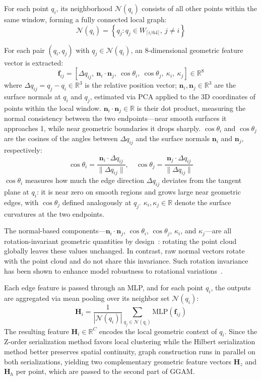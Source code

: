 \documentclass[a4paper,fleqn]{cas-sc}
\begin{document}
For each point $q_i$, its neighborhood $\mathcal{N}(q_i)$ consists of all other points within the same window, forming a fully connected local graph:
\begin{equation}
	\mathcal{N}(q_i) = \left\{q_j : q_j \in W_{\lceil i/64 \rceil},\ j \neq i\right\}
\end{equation}

For each pair $(q_i, q_j)$ with $q_j \in \mathcal{N}(q_i)$, an 8-dimensional geometric feature vector is extracted:
\begin{equation}
	\mathbf{f}_{ij} = [\Delta q_{ij},\ \mathbf{n}_i \cdot \mathbf{n}_j,\ \cos\theta_i,\ \cos\theta_j,\ \kappa_i,\ \kappa_j] \in \mathbb{R}^8
\end{equation}
where $\Delta q_{ij} = q_j - q_i \in \mathbb{R}^3$ is the relative position vector; $\mathbf{n}_i, \mathbf{n}_j \in \mathbb{R}^3$ are the surface normals at $q_i$ and $q_j$, estimated via PCA applied to the 3D coordinates of points within the local window. $\mathbf{n}_i \cdot \mathbf{n}_j \in \mathbb{R}$ is their dot product, measuring the normal consistency between the two endpoints—near smooth surfaces it approaches 1, while near geometric boundaries it drops sharply. $\cos\theta_i$ and $\cos\theta_j$ are the cosines of the angles between $\Delta q_{ij}$ and the surface normals $\mathbf{n}_i$ and $\mathbf{n}_j$, respectively:
\begin{equation}
	\cos\theta_i = \frac{\mathbf{n}_i \cdot \Delta q_{ij}}{\|\Delta q_{ij}\|}, \quad \cos\theta_j = \frac{\mathbf{n}_j \cdot \Delta q_{ij}}{\|\Delta q_{ij}\|}
\end{equation}
$\cos\theta_i$ measures how much the edge direction $\Delta q_{ij}$ deviates from the tangent plane at $q_i$: it is near zero on smooth regions and grows large near geometric edges, with $\cos\theta_j$ defined analogously at $q_j$. $\kappa_i, \kappa_j \in \mathbb{R}$ denote the surface curvatures at the two endpoints.

The normal-based components—$\mathbf{n}_i \cdot \mathbf{n}_j$, $\cos\theta_i$, $\cos\theta_j$, $\kappa_i$, and $\kappa_j$—are all rotation-invariant geometric quantities by design~\cite{clusterNet, riconv}: rotating the point cloud globally leaves these values unchanged. In contrast, raw normal vectors rotate with the point cloud and do not share this invariance. Such rotation invariance has been shown to enhance model robustness to rotational variations~\cite{clusterNet, riconv}.

Each edge feature is passed through an MLP, and for each point $q_i$, the outputs are aggregated via mean pooling over its neighbor set $\mathcal{N}(q_i)$:
\begin{equation}
	\mathbf{H}_i = \frac{1}{|\mathcal{N}(q_i)|} \sum_{q_j \in \mathcal{N}(q_i)} \text{MLP}(\mathbf{f}_{ij})
\end{equation}
The resulting feature $\mathbf{H}_i \in \mathbb{R}^C$ encodes the local geometric context of $q_i$. Since the Z-order serialization method favors local clustering while the Hilbert serialization method better preserves spatial continuity, graph construction runs in parallel on both serializations, yielding two complementary geometric feature vectors $\mathbf{H}_z$ and $\mathbf{H}_h$ per point, which are passed to the second part of GGAM.
\end{document}

